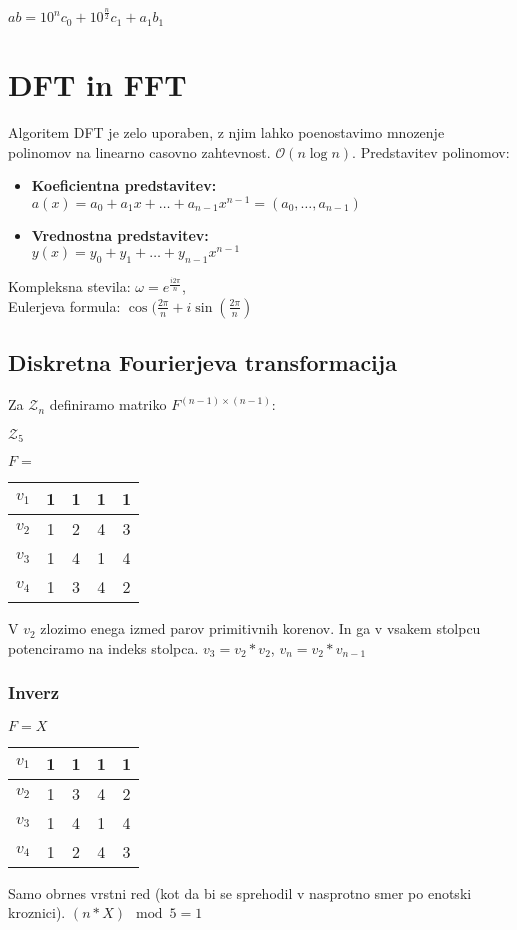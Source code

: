 \documentclass{article}
\begin{document}
\begin{multicols}{2}
	\begin{center}
		\begin{math}
			ab = 10^n c_0 + 10^{\frac{n}{2}} c_1 + a_1 b_1
		\end{math}
	\end{center}
	\section{DFT in FFT}
	Algoritem DFT je zelo uporaben, z njim lahko poenostavimo mnozenje polinomov na linearno casovno zahtevnost. $\mathcal{O}(n \log n)$.
	Predstavitev polinomov:

	\begin{itemize}
		\item \textbf{Koeficientna predstavitev:}\\ $a(x) = a_0 +  a_1 x + \dots + a_{n-1} x^{n-1} = (a_0, \dots, a_{n-1})$
		\item \textbf{Vrednostna predstavitev:}\\ $y(x) = y_0 +  y_1 + \dots + y_{n-1} x^{n-1}$
	\end{itemize}
	Kompleksna stevila:
	$\omega = e^{\frac{i 2 \pi}{n}}$,\\
	Eulerjeva formula:
	$\cos(\frac{2\pi}{n} + i \sin(\frac{2\pi}{n})$


	\subsection{Diskretna Fourierjeva transformacija}
	Za $\mathcal{Z}_n$ definiramo matriko $F^{(n-1) \times (n-1)}$:

	$\mathcal{Z}_5$
	\begin{center}
		$F =$
		\begin{tabular}{ |c|c|c|c|c| }
			\hline
			$v_1$ & 1 & 1 & 1 & 1 \\
			\hline
			$v_2$ & 1 & 2 & 4 & 3 \\
			\hline
			$v_3$ & 1 & 4 & 1 & 4 \\
			\hline
			$v_4$ & 1 & 3 & 4 & 2 \\
			\hline
		\end{tabular}
	\end{center}
	V $v_2$ zlozimo enega izmed parov primitivnih korenov. In ga v vsakem stolpcu potenciramo na indeks stolpca.
	$v_3 = v_2 * v_2$, $v_n = v_2 * v_{n-1}$

	\subsubsection{Inverz}
	\begin{center}
		$F = X$
		\begin{tabular}{ |c|c|c|c|c| }
			\hline
			$v_1$ & 1 & 1 & 1 & 1 \\
			\hline
			$v_2$ & 1 & 3 & 4 & 2 \\
			\hline
			$v_3$ & 1 & 4 & 1 & 4 \\
			\hline
			$v_4$ & 1 & 2 & 4 & 3 \\
			\hline
		\end{tabular}
	\end{center}
	Samo obrnes vrstni red (kot da bi se sprehodil v nasprotno smer po enotski kroznici).
	$(n * X) \mod 5 = 1$

\end{multicols}
\end{document}
